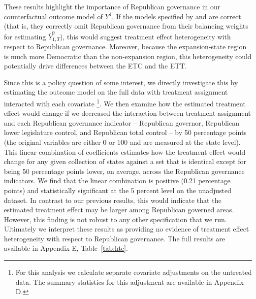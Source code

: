 These results highlight the importance of Republican governance in our counterfactual outcome model of $Y^1$. If the models specified by \cite{kaestner2017effects} and \cite{courtemanche2017early} are correct (that is, they correctly omit Republican governance from their balancing weights for estimating $\bar{Y}^0_{1, T}$), this would suggest treatment effect heterogeneity with respect to Republican governance. Moreover, because the expansion-state region is much more Democratic than the non-expansion region, this heterogeneity could potentially drive differences between the ETC and the ETT.

Since this is a policy question of some interest, we directly investigate this by estimating the outcome model on the full data with treatment assignment interacted with each covariate \footnote{For this analysis we calculate separate covariate adjustments on the untreated data. The summary statistics for this adjustment are available in Appendix D.}. We then examine how the estimated treatment effect would change if we decreased the interaction between treatment assignment and each Republican governance indicator -- Republican governor, Republican lower legislature control, and Republican total control -- by 50 percentage points (the original variables are either 0 or 100 and are measured at the state level). This linear combination of coefficients estimates how the treatment effect would change for any given collection of states against a set that is identical except for being 50 percentage points lower, on average, across the Republican governance indicators. We find that the linear combination is positive (0.21 percentage points) and statistically significant at the 5 percent level on the unadjusted dataset. In contrast to our previous results, this would indicate that the estimated treatment effect may be larger among Republican governed areas. However, this finding is not robust to any other specification that we run. Ultimately we interpret these results as providing no evidence of treatment effect heterogeneity with respect to Republican governance. The full results are available in Appendix E, Table~\ref{tab:hte}.

